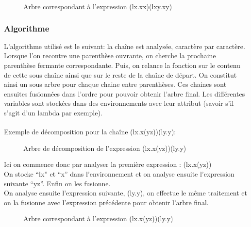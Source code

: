 \documentclass[a4paper,11pt,titlepage]{article}
\begin{document}
\begin{figure}[H]
\centering
  {
	 {{
		 {
			  {
			   {}
			   {}
			  }
		 }
	 }
	{
		 {
			  {
			   {{}
			   {}}
			  }
		 }
	}}
  }
\caption{Arbre correspondant à l'expression (lx.xx)(lxy.xy)}
 \label{tree1}
\end{figure}

\subsubsection{Algorithme}
L'algorithme utilisé est le suivant: la chaîne est analysée, caractère par caractère. Lorsque l'on recontre une parenthèse ouvrante, on cherche la prochaine parenthèse fermante correspondante. Puis, on relance la fonction sur le contenu de cette sous chaîne ainsi que sur le reste de la chaîne de départ. On constitut ainsi un sous arbre pour chaque chaine entre parenthèses. Ces chaines sont ensuites fusionnées dans l'ordre pour pouvoir obtenir l'arbre final.
Les différentes variables sont stockées dans des environnements avec leur attribut (savoir s'il s'agit d'un lambda par exemple).
\\
\\Exemple de décomposition pour la chaîne (lx.x(yz))(ly.y):
\begin{figure}[H]
\centering
  {
	 {{
			  {
			   {}
			   {}
			  }
		 
	 }
	{}
	}
  }
\caption{Arbre de décomposition de l'expression (lx.x(yz))(ly.y)}
 \label{tree2}
\end{figure}

Ici on commence donc par analyser la première expression : (lx.x(yz))\\
On stocke ``lx'' et ``x'' dans l'environnement et on analyse ensuite l'expression suivante ``yz''. Enfin on les fusionne.\\

On analyse ensuite l'expression suivante, (ly.y), on effectue le même traitement et on la fusionne avec l'expression précédente pour obtenir l'arbre final.
\begin{figure}[H]
\centering
  {
	 {{
		 {
			  {
			   {}
			   {
			      {{}
			       {}}
			   }
			  }
		 }
	 }
	{
		{}


	}}
  }
\caption{Arbre correspondant à l'expression (lx.x(yz))(ly.y)}
 \label{tree3}
\end{figure}
\end{document}
